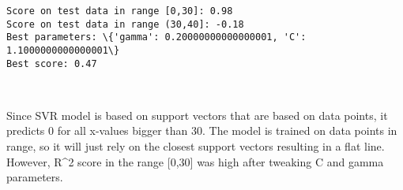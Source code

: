 \documentclass[11pt]{article}
\begin{document}
    \begin{Verbatim}[commandchars=\\\{\}]
Score on test data in range [0,30]: 0.98
Score on test data in range (30,40]: -0.18
Best parameters: \{'gamma': 0.20000000000000001, 'C': 1.1000000000000001\}
Best score: 0.47

    \end{Verbatim}

    \begin{center}
    \end{center}
    { \hspace*{\fill} \\}
    
    Since SVR model is based on support vectors that are based on data
points, it predicts 0 for all x-values bigger than 30. The model is
trained on data points in range, so it will just rely on the closest
support vectors resulting in a flat line. However, R\^{}2 score in the
range {[}0,30{]} was high after tweaking C and gamma parameters.
\end{document}
